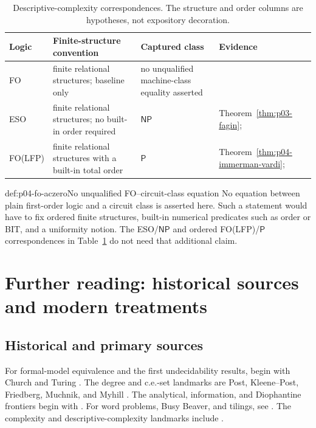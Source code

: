 \begin{table}[htbp]
\centering
\small
\begin{tabular}{@{}p{}p{}p{}p{}@{}}
\toprule
Logic & Finite-structure convention & Captured class & Evidence \\
\midrule
FO & finite relational structures; baseline only & no unqualified
machine-class equality asserted & \cite{Immerman1999} \\
ESO & finite relational structures; no built-in order required &
\(\mathsf{NP}\) & Theorem~\ref{thm:p03-fagin}; \cite{Fagin1974} \\
FO(LFP) & finite relational structures with a built-in total order &
\(\mathsf P\) & Theorem~\ref{thm:p04-immerman-vardi};
\cite{Immerman1986,Vardi1982} \\
\bottomrule
\end{tabular}
\caption{Descriptive-complexity correspondences.  The
structure and order columns are hypotheses, not expository decoration.}
\label{tab:p04-descriptive-complexity}
\end{table}

\begin{hbwarning}{def:p04-fo-aczero}{No unqualified FO--circuit-class equation}
No equation between plain first-order logic and a circuit class is asserted
here.  Such a statement would have to fix ordered finite structures,
built-in numerical predicates such as order or BIT, and a uniformity notion.
The ESO/\(\mathsf{NP}\) and ordered FO(LFP)/\(\mathsf P\) correspondences in
Table~\ref{tab:p04-descriptive-complexity} do not need that additional claim.
\end{hbwarning}

\section{Further reading: historical sources and modern treatments}
\label{sec:p04-further-reading}

\subsection*{Historical and primary sources}

For formal-model equivalence and the first undecidability results, begin with
Church and Turing \cite{Church1936,Turing1937,Turing1937Lambda}.  The degree
and c.e.-set landmarks are Post, Kleene--Post, Friedberg, Muchnik, and Myhill
\cite{Post1944,KleenePost1954,Friedberg1957,Muchnik1956,Myhill1955}.
The analytical, information, and Diophantine frontiers begin with
\cite{Kleene1955Hierarchy,Kolmogorov1965,Chaitin1974,Chaitin1975,
DavisPutnamRobinson1961,Matiyasevich1970}.  For word problems, Busy Beaver,
and tilings, see \cite{Post1947,Markov1947,Novikov1955,Boone1959,
Rado1962BusyBeaver,Berger1966}.  The complexity and descriptive-complexity
landmarks include \cite{HartmanisStearns1965,StearnsHartmanisLewis1965,
Cook1971,Levin1973,StockmeyerMeyer1973,Fagin1974,Immerman1986}.


